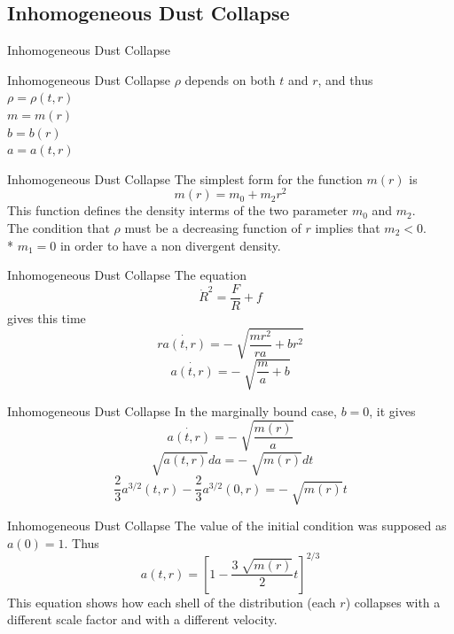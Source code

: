 \documentclass{beamer}
\begin{document}
\begin{darkframes}

\subsection{Inhomogeneous Dust Collapse}
\begin{frame}
	\huge
    Inhomogeneous Dust Collapse
\end{frame}

\begin{frame}{Inhomogeneous Dust Collapse}
    $\rho$ depends on both $t$ and $r$, and thus\\
    \bigskip
    \pause
    $\rho = \rho(t,r)$\\
    $m = m(r)$\\
    $b = b(r)$\\
    $a = a(t,r)$
\end{frame}

\begin{frame}{Inhomogeneous Dust Collapse}
    The simplest form for the function $m(r)$ is
    $$m(r) = m_0 + m_2 r^2$$
    \pause
    This function defines the density interms of the two parameter $m_0$ and $m_2$.\\
    \pause
    The condition that $\rho$ must be a decreasing function of $r$ implies that $m_2 <0$.\\
    \bigskip
    \pause
    \footnotesize
    * $m_1=0$ in order to have a non divergent density. 
\end{frame}

\begin{frame}{Inhomogeneous Dust Collapse}
    The equation
    $$ \dot{R}^2 = \frac{F}{R} + f$$
    gives this time
    $$r \dot{a(t,r)} = - \sqrt[]{\frac{mr^2}{ra} + b r^2}$$
    \pause
    $$\dot{a(t,r)} = - \sqrt[]{\frac{m}{a} + b}$$
\end{frame}

\begin{frame}{Inhomogeneous Dust Collapse}
    In the marginally bound case, $b=0$, it gives
    \pause
    $$\dot{a(t,r)} = - \sqrt[]{\frac{m(r)}{a}}$$
    \pause
    $$\sqrt[]{a(t,r)} da = - \sqrt[]{m(r)}dt$$
    \pause
 	$$\frac{2}{3} a^{3/2}(t,r) - \frac{2}{3} a^{3/2}(0,r) = -\sqrt[]{m(r)} t$$
\end{frame}

\begin{frame}{Inhomogeneous Dust Collapse}
    The value of the initial condition was supposed as $a(0)=1$. Thus
    $$a(t,r) = \left[ 1-\frac{3\sqrt[]{m(r)}}{2}t \right]^{2/3}$$
    \pause
    This equation shows how each shell of the distribution (each $r$) collapses with a different scale factor and with a different velocity.
\end{frame}


\end{darkframes}
\end{document}
